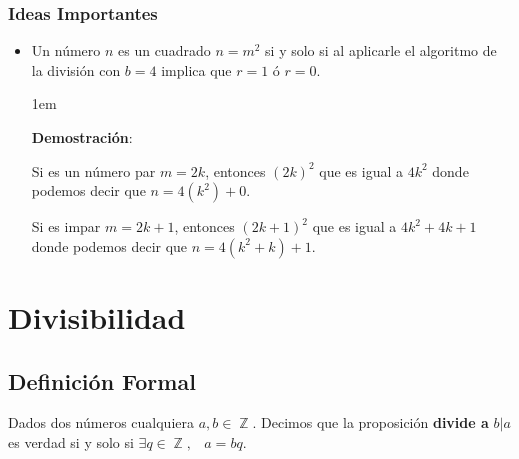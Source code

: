 \documentclass[12pt]{report}                                    %
\newcommand \Quote {\qq}                                        %
\newenvironment{SmallIndentation}[1][0.75em]                    %
    {\begin{adjustwidth}{#1}{}\begin{footnotesize}}                 %
    {\end{footnotesize}\end{adjustwidth}}                           %
\DeclareMathOperator \Space {\quad}                             %
\DeclareMathOperator \MiniSpace {\;}                            %
\DeclareMathOperator \Integers  {\mathbb{Z}}                     %
\begin{document}
            \subsubsection{Ideas Importantes}
            \begin{itemize}

                \item Un número $n$ es un cuadrado $n=m^2$ si y solo si al aplicarle
                el algoritmo de la división con $b=4$ implica que $r=1$ ó $r=0$.

                    \begin{SmallIndentation}[1em]
                        \textbf{Demostración}:

                        Si es un número par $m=2k$, entonces $(2k)^2$ que 
                        es igual a $4k^2$ donde podemos decir que
                        $n=4(k^2)+0$.

                        Si es impar $m=2k+1$, entonces $(2k+1)^2$ que 
                        es igual a $4k^2+4k+1$ donde podemos decir que
                        $n=4(k^2+k)+1$. 

                    \end{SmallIndentation}

                \end{itemize}




    \clearpage
    \section{Divisibilidad}



        \subsection*{Definición Formal}

            Dados dos números cualquiera $a, b \in \Integers$. Decimos que la proposición
            \textbf{\Quote{b} divide a \Quote{a}} $b|a$ es verdad si y solo si 
            $\exists q \in \Integers, \MiniSpace a = bq$.
\end{document}
